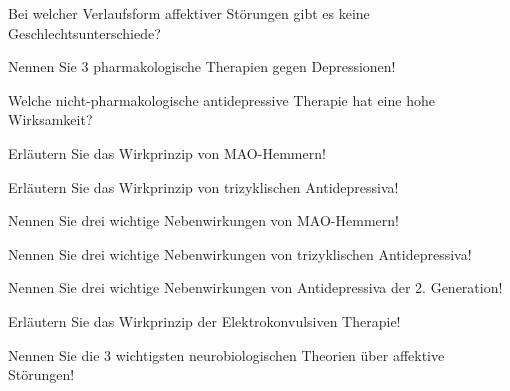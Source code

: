 \documentclass[10pt, a4paper]{exam}
\begin{document}
\begin{questions}
  \question Bei welcher Verlaufsform affektiver Störungen gibt es keine Geschlechtsunterschiede?
  \begin{solution}

  \end{solution}

  \question Nennen Sie 3 pharmakologische Therapien gegen Depressionen!
  \begin{solution}

  \end{solution}

  \question Welche nicht-pharmakologische antidepressive Therapie hat eine hohe Wirksamkeit?
  \begin{solution}

  \end{solution}

  \question Erläutern Sie das Wirkprinzip von MAO-Hemmern!
  \begin{solution}

  \end{solution}

  \question Erläutern Sie das Wirkprinzip von trizyklischen Antidepressiva!
  \begin{solution}

  \end{solution}

  \question Nennen Sie drei wichtige Nebenwirkungen von MAO-Hemmern!
  \begin{solution}

  \end{solution}

  \question Nennen Sie drei wichtige Nebenwirkungen von trizyklischen Antidepressiva!
  \begin{solution}

  \end{solution}

  \question Nennen Sie drei wichtige Nebenwirkungen von Antidepressiva der 2.  Generation!
  \begin{solution}

  \end{solution}

  \question Erläutern Sie das Wirkprinzip der Elektrokonvulsiven Therapie!
  \begin{solution}

  \end{solution}

  \question Nennen Sie die 3 wichtigsten neurobiologischen Theorien über affektive Störungen!
  \begin{solution}


\end{solution}
\end{questions}
\end{document}
